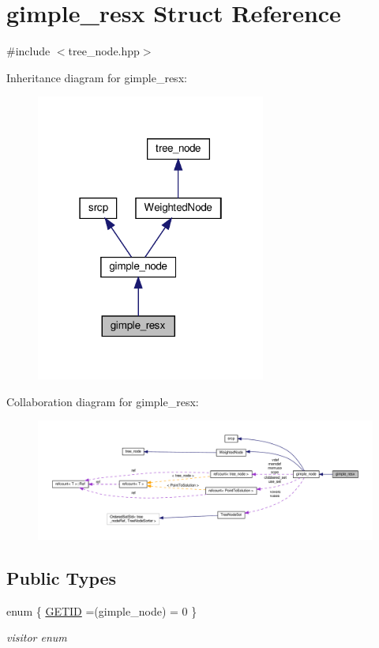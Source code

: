 \hypertarget{structgimple__resx}{}\section{gimple\+\_\+resx Struct Reference}
\label{structgimple__resx}


{\ttfamily \#include $<$tree\+\_\+node.\+hpp$>$}



Inheritance diagram for gimple\+\_\+resx\+:
\nopagebreak
\begin{figure}[H]
\begin{center}
\leavevmode
\includegraphics[width=214pt]{d8/db1/structgimple__resx__inherit__graph}
\end{center}
\end{figure}


Collaboration diagram for gimple\+\_\+resx\+:
\nopagebreak
\begin{figure}[H]
\begin{center}
\leavevmode
\includegraphics[width=350pt]{de/daa/structgimple__resx__coll__graph}
\end{center}
\end{figure}
\subsection*{Public Types}
\begin{DoxyCompactItemize}
\item 
enum \{ \hyperlink{structgimple__resx_a89e769b487966c6c61df79ee86472a30a584472dc981d29b7f8ec4eb3babed3a7}{G\+E\+T\+ID} =(gimple\+\_\+node) = 0
 \}\begin{DoxyCompactList}\small\item\em visitor enum \end{DoxyCompactList}
\end{DoxyCompactItemize}
